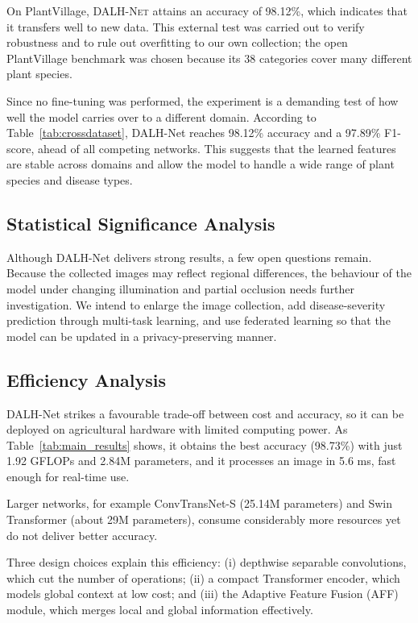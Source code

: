 \documentclass[default, iicol]{sn-jnl}
\theoremstyle{thmstyleone}%
\theoremstyle{thmstyletwo}%
\theoremstyle{thmstylethree}%
\newcommand{\dalh}{\textsc{DALH-Net}}
\begin{document}
On PlantVillage, \dalh{} attains an accuracy of 98.12\%, which indicates that it transfers well to new data. This external test was carried out to verify robustness and to rule out overfitting to our own collection; the open PlantVillage benchmark was chosen because its 38 categories cover many different plant species.

Since no fine-tuning was performed, the experiment is a demanding test of how well the model carries over to a different domain. According to Table~\ref{tab:crossdataset}, DALH-Net reaches 98.12\% accuracy and a 97.89\% F1-score, ahead of all competing networks. This suggests that the learned features are stable across domains and allow the model to handle a wide range of plant species and disease types.

\subsection{Statistical Significance Analysis}

Although DALH-Net delivers strong results, a few open questions remain. Because the collected images may reflect regional differences, the behaviour of the model under changing illumination and partial occlusion needs further investigation. We intend to enlarge the image collection, add disease-severity prediction through multi-task learning, and use federated learning so that the model can be updated in a privacy-preserving manner.


\subsection{Efficiency Analysis}

DALH-Net strikes a favourable trade-off between cost and accuracy, so it can be deployed on agricultural hardware with limited computing power. As Table~\ref{tab:main_results} shows, it obtains the best accuracy (98.73\%) with just 1.92 GFLOPs and 2.84M parameters, and it processes an image in 5.6 ms, fast enough for real-time use.

Larger networks, for example ConvTransNet-S (25.14M parameters) and Swin Transformer (about 29M parameters), consume considerably more resources yet do not deliver better accuracy.

Three design choices explain this efficiency: (i) depthwise separable convolutions, which cut the number of operations; (ii) a compact Transformer encoder, which models global context at low cost; and (iii) the Adaptive Feature Fusion (AFF) module, which merges local and global information effectively.
\end{document}
